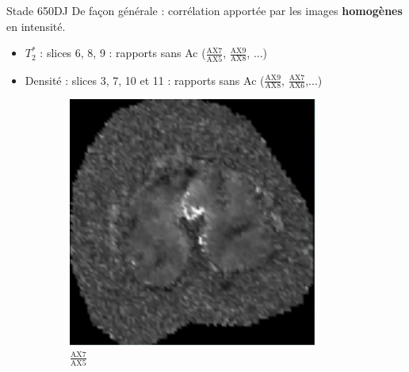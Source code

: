 \documentclass[10pt]{beamer}
\begin{document}
\begin{frame}{Stade 650DJ}
  De façon générale : corrélation apportée par les images \textbf{homogènes} en intensité.

   \begin{itemize}
  \item  $T_2^*$ : slices 6, 8, 9 : rapports sans Ac ($\frac{\text{AX7}}{\text{AX5}}$, $\frac{\text{AX9}}{\text{AX8}}$, ...)
  \item  Densité : slices 3, 7, 10 et 11 : rapports sans Ac ($\frac{\text{AX9}}{\text{AX8}}$, $\frac{\text{AX7}}{\text{AX6}}$,...)
  \end{itemize}

    \begin{figure}[ht]
      \centering
          \begin{subfigure}[t]{0.25\textwidth}
      \centering
      \includegraphics[width=0.9\textwidth]{fig/t2_650_slice6}
      \caption{$\frac{\text{AX7}}{\text{AX5}}$}
      \label{subfig:density_650_slice10}
    \end{subfigure}%
    \begin{subfigure}[t]{0.25\textwidth}
      \centering

\end{subfigure}
\end{figure}
\end{frame}
\end{document}
